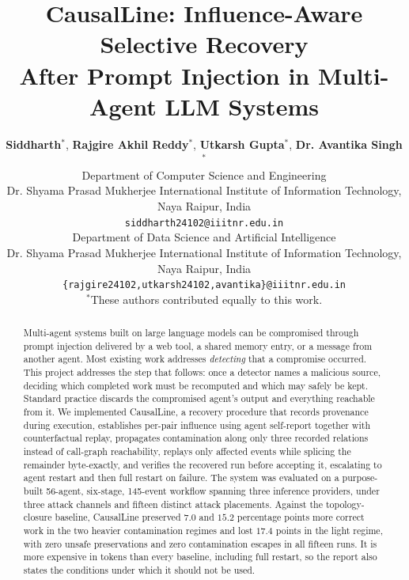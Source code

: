 \documentclass[10pt,twocolumn,a4paper]{article}
\newcommand{\sys}{CausalLine}
\begin{document}
\title{\textbf{\sys{}: Influence-Aware Selective Recovery\\
After Prompt Injection in Multi-Agent LLM Systems}}

\author{
\textbf{Siddharth}$^{*}$, 
\textbf{Rajgire Akhil Reddy}$^{*}$,
\textbf{Utkarsh Gupta}$^{*}$,
\textbf{Dr. Avantika Singh}$^{*}$\\[2mm]
Department of Computer Science and Engineering\\
Dr. Shyama Prasad Mukherjee International Institute of Information Technology, Naya Raipur, India\\
\texttt{siddharth24102@iiitnr.edu.in}\\[2mm]
Department of Data Science and Artificial Intelligence\\
Dr. Shyama Prasad Mukherjee International Institute of Information Technology, Naya Raipur, India\\
\texttt{\{rajgire24102,utkarsh24102,avantika\}@iiitnr.edu.in}\\[2mm]
$^{*}$These authors contributed equally to this work.
}

\date{}

\maketitle

\begin{abstract}
Multi-agent systems built on large language models can be compromised through
prompt injection delivered by a web tool, a shared memory entry, or a message
from another agent. Most existing work addresses \emph{detecting} that a
compromise occurred. This project addresses the step that follows: once a
detector names a malicious source, deciding which completed work must be
recomputed and which may safely be kept. Standard practice discards the
compromised agent's output and everything reachable from it. We implemented
\sys{}, a recovery procedure that records provenance during execution,
establishes per-pair influence using agent self-report together with
counterfactual replay, propagates contamination along only three recorded
relations instead of call-graph reachability, replays only affected events
while splicing the remainder byte-exactly, and verifies the recovered run
before accepting it, escalating to agent restart and then full restart on
failure. The system was evaluated on a purpose-built 56-agent, six-stage,
145-event workflow spanning three inference providers, under three attack
channels and fifteen distinct attack placements. Against the topology-closure
baseline, \sys{} preserved $7.0$ and $15.2$ percentage points more correct work
in the two heavier contamination regimes and lost $17.4$ points in the light
regime, with zero unsafe preservations and zero contamination escapes in all
fifteen runs. It is more expensive in tokens than every baseline, including
full restart, so the report also states the conditions under which it should
not be used.
\end{abstract}
\end{document}
